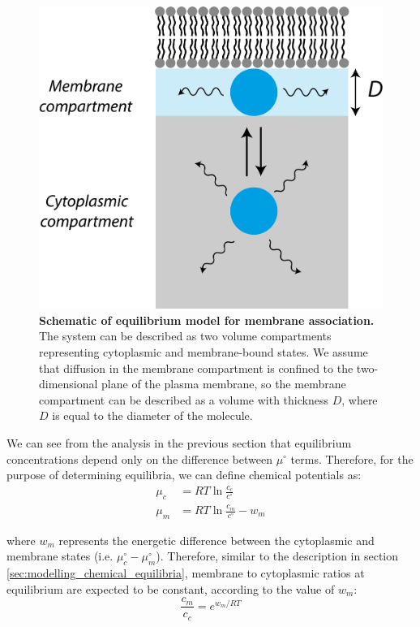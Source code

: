 \documentclass[12pt]{"report"}
\newcommand{\mycaption}[2]{\caption[#1]{\textbf{#1.} #2}}
\begin{document}
\begin{figure}
\includegraphics[scale=1]{thermodynamic_membrane_binding_schematic}
\mycaption{Schematic of equilibrium model for membrane association}{
The system can be described as two volume compartments representing cytoplasmic and membrane-bound states. We assume that diffusion in the membrane compartment is confined to the two-dimensional plane of the plasma membrane, so the membrane compartment can be described as a volume with thickness $D$, where $D$ is equal to the diameter of the molecule.
}
\label{fig:thermodynamic_membrane_binding_schematic}
\end{figure}

We can see from the analysis in the previous section that equilibrium concentrations depend only on the difference between $\mu^{\circ}$ terms. Therefore, for the purpose of determining equilibria, we can define chemical potentials as:
\begin{align}
\mu_c &= RT \ln \frac{c_c}{c^{\circ}}\\
\mu_m &= RT \ln \frac{c_m}{c^{\circ}} - w_m
\end{align} 

where $w_m$ represents the energetic difference between the cytoplasmic and membrane states (i.e. $\mu_c^{\circ} - \mu_m^{\circ}$). Therefore, similar to the description in section \ref{sec:modelling_chemical_equilibria}, membrane to cytoplasmic ratios at equilibrium are expected to be constant, according to the value of $w_m$:
\begin{equation}
\frac{c_m}{c_c} = e^{w_m/RT}
\end{equation}
\end{document}
